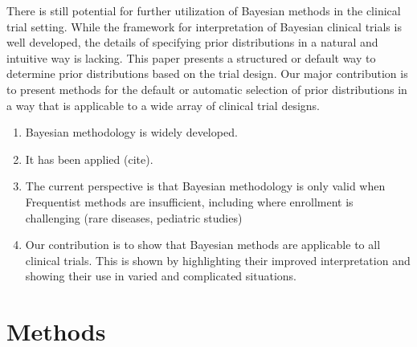 \documentclass[12pt]{article}
\begin{document}
There is still potential for further utilization of Bayesian methods in the clinical trial setting. While the framework for interpretation of Bayesian clinical trials is well developed, the details of specifying prior distributions in a natural and intuitive way is lacking. This paper presents a structured or default way to determine prior distributions based on the trial design. Our major contribution is to present methods for the default or automatic selection of prior distributions in a way that is applicable to a wide array of clinical trial designs.

\begin{enumerate}
\item Bayesian methodology is widely developed.
\item It has been applied (cite).
\item The current perspective is that Bayesian methodology is only valid when Frequentist methods are insufficient, including where enrollment is challenging (rare diseases, pediatric studies)
\item Our contribution is to show that Bayesian methods are applicable to all clinical trials. This is shown by highlighting their improved interpretation and showing their use in varied and complicated situations.
\end{enumerate}

\section{Methods}
\end{document}
